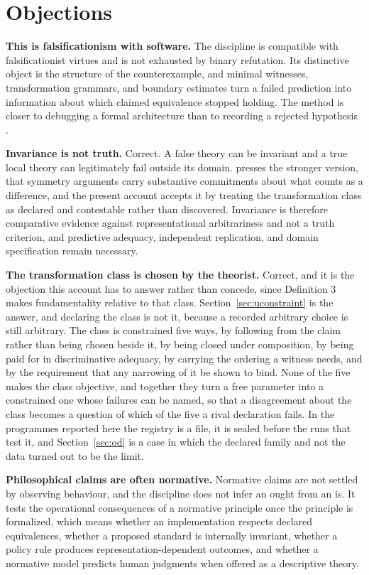 \documentclass[11pt]{article}
\theoremstyle{remark}
\begin{document}
\section{Objections}

\textbf{This is falsificationism with software.} The discipline is compatible with
falsificationist virtues and is not exhausted by binary refutation. Its distinctive
object is the structure of the counterexample, and minimal witnesses, transformation
grammars, and boundary estimates turn a failed prediction into information about
which claimed equivalence stopped holding. The method is closer to debugging a
formal architecture than to recording a rejected hypothesis \citep{zeller2002}.

\textbf{Invariance is not truth.} Correct. A false theory can be invariant and a
true local theory can legitimately fail outside its domain.
\citet{vanfraassen1989} presses the stronger version, that symmetry arguments carry
substantive commitments about what counts as a difference, and the present account
accepts it by treating the transformation class as declared and contestable rather
than discovered. Invariance is therefore comparative evidence against
representational arbitrariness and not a truth criterion, and predictive adequacy,
independent replication, and domain specification remain necessary.

\textbf{The transformation class is chosen by the theorist.} Correct, and it is the
objection this account has to answer rather than concede, since Definition 3 makes
fundamentality relative to that class. Section~\ref{sec:uconstraint} is the answer,
and declaring the class is not it, because a recorded arbitrary choice is still
arbitrary. The class is constrained five ways, by following from the claim rather
than being chosen beside it, by being closed under composition, by being paid for in
discriminative adequacy, by carrying the ordering a witness needs, and by the
requirement that any narrowing of it be shown to bind. None of the five makes the
class objective, and together they turn a free parameter into a constrained one
whose failures can be named, so that a disagreement about the class becomes a
question of which of the five a rival declaration fails. In the programmes reported
here the registry is a file, it is sealed before the runs that test it, and
Section~\ref{sec:od} is a case in which the declared family and not the data turned
out to be the limit.

\textbf{Philosophical claims are often normative.} Normative claims are not settled
by observing behaviour, and the discipline does not infer an ought from an is. It
tests the operational consequences of a normative principle once the principle is
formalized, which means whether an implementation respects declared equivalences,
whether a proposed standard is internally invariant, whether a policy rule produces
representation-dependent outcomes, and whether a normative model predicts human
judgments when offered as a descriptive theory.
\end{document}
